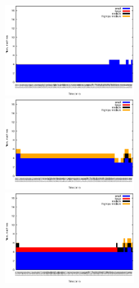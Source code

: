 \begin{figure}[htb]
	\begin{minipage}[b]{0.19\linewidth}
		\vspace{-4mm}
		\includegraphics[width=\linewidth,height=4cm]{images/exps2011/low/das/inst_type_machines.eps}	
		\vspace{-4mm}
	\end{minipage}
	\hfill
\begin{minipage}[b]{0.2\linewidth}
		\vspace{-4mm}
		\includegraphics[width=\linewidth,height=4cm]{images/exps2011/medium_down/das/inst_type_machines.eps}
		\vspace{-4mm}
	\end{minipage}
\hfill
	\begin{minipage}[b]{0.2\linewidth}
		\vspace{-4mm}
		\includegraphics[width=\linewidth,height=4cm]{images/exps2011/medium/das/inst_type_machines.eps}
		\vspace{-4mm}
	\end{minipage}
\hfill
	\begin{minipage}[b]{0.2\linewidth}

\end{minipage}
\end{figure}
